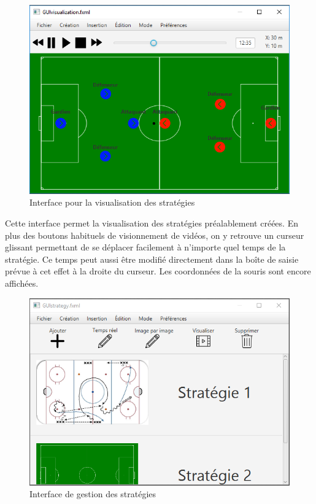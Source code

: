 \begin{figure}[htpb]
    \centering
    \includegraphics[scale=0.7]{fig/gui/gui_visualisation.png}
    \caption{Interface pour la visualisation des stratégies}
    \label{fig:gui:gui_visualisation}
\end{figure}

Cette interface permet la visualisation des stratégies préalablement créées. 
En plus des boutons habituels de visionnement de vidéos, on y retrouve un curseur glissant permettant de se déplacer facilement à n'importe quel temps de la stratégie.
Ce temps peut aussi être modifié directement dans la boîte de saisie prévue à cet effet à la droite du curseur.
Les coordonnées de la souris sont encore affichées.

\begin{figure}[htpb]
    \centering
    \includegraphics[scale=0.7]{fig/gui/gui_strategie.png}
    \caption{Interface de gestion des stratégies}
    \label{fig:gui:gui_strategie}
\end{figure}

